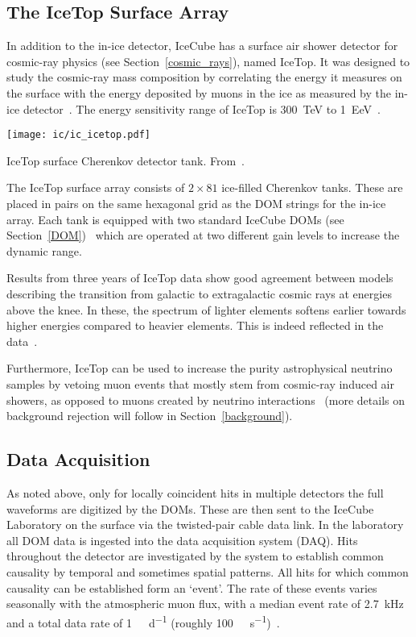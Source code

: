 \subsection{The IceTop Surface Array}
In addition to the in-ice detector, IceCube has a surface air shower detector for cosmic-ray physics (see Section~\ref{cosmic_rays}), named IceTop. It was designed to study the cosmic-ray mass composition by correlating the energy it measures on the surface with the energy deposited by muons in the ice as measured by the in-ice detector~. The energy sensitivity range of IceTop is \SI{300}{\tera\eV} to \SI{1}{\exa\eV}~.

\begin{marginfigure}
    \texttt{[image: ic/ic\_icetop.pdf]}
    \caption[IceTop detector]{IceTop surface Cherenkov detector tank. From~\cite{Abbasi2013}.}
\end{marginfigure}

The IceTop surface array consists of $2\times81$ ice-filled Cherenkov tanks. These are placed in pairs on the same hexagonal grid as the DOM strings for the in-ice array. Each tank is equipped with two standard IceCube DOMs (see Section~\ref{DOM})~\cite{Abbasi2013} which are operated at two different gain levels to increase the dynamic range.

Results from three years of IceTop data show good agreement between models describing the transition from galactic to extragalactic cosmic rays at energies above the knee. In these, the spectrum of lighter elements softens earlier towards higher energies compared to heavier elements. This is indeed reflected in the data~.

Furthermore, IceTop can be used to increase the purity astrophysical neutrino samples by vetoing muon events that mostly stem from cosmic-ray induced air showers, as opposed to muons created by neutrino interactions~ (more details on background rejection will follow in Section~\ref{background}).

\subsection{Data Acquisition}\label{data_acquisition}
As noted above, only for locally coincident hits in multiple detectors the full waveforms are digitized by the DOMs. These are then sent to the IceCube Laboratory on the surface via the twisted-pair cable data link. In the laboratory all DOM data is ingested into the data acquisition system (DAQ). Hits throughout the detector are investigated by the system to establish common causality by temporal and sometimes spatial patterns. All hits for which common causality can be established form an `event'. The rate of these events varies seasonally with the atmospheric muon flux, with a median event rate of \SI{2.7}{\kilo\Hz} and a total data rate of \SI{1}{\tera\byte\per\day} (roughly \SI{100}{\mega\bit\per\second})~\cite{Aartsen2017}.


